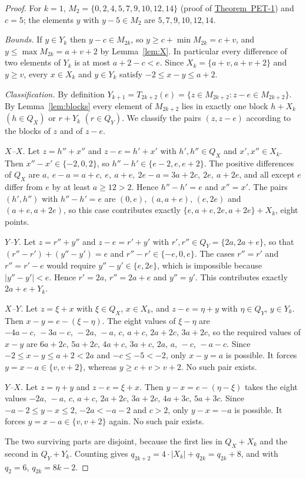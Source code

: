 \documentclass[11pt]{amsart}
\theoremstyle{definition}
\theoremstyle{remark}
\theoremstyle{plain}
\numberwithin{equation}{section}
\newcommand{\PETone}{\hyperref[thm:pet1]{Theorem~PET-1}}
\begin{document}
\begin{proof}
For $k=1$, $M_2=\{0,2,4,5,7,9,10,12,14\}$ (proof of \PETone) and $c=5$; the elements $y$ with
$y-5\in M_2$ are $5,7,9,10,12,14$.

\emph{Bounds.} If $y\in Y_k$ then $y-c\in M_{2k}$, so $y\ge c+\min M_{2k}=c+v$, and
$y\le\max M_{2k}=a+v+2$ by Lemma~\ref{lem:X}. In particular every difference of two elements of
$Y_k$ is at most $a+2-c<e$. Since $X_k=\{a+v,a+v+2\}$ and $y\ge v$, every $x\in X_k$ and
$y\in Y_k$ satisfy $-2\le x-y\le a+2$.

\emph{Classification.} By definition $Y_{k+1}=T_{2k+2}(e)=\{z\in M_{2k+2}:z-e\in M_{2k+2}\}$. By
Lemma~\ref{lem:blocks} every element of $M_{2k+2}$ lies in exactly one block $h+X_k$ $(h\in Q_X)$
or $r+Y_k$ $(r\in Q_Y)$. We classify the pairs $(z,z-e)$ according to the blocks of $z$ and of
$z-e$.

\emph{$X$--$X$.} Let $z=h''+x''$ and $z-e=h'+x'$ with $h',h''\in Q_X$ and $x',x''\in X_k$. Then
$x''-x'\in\{-2,0,2\}$, so $h''-h'\in\{e-2,e,e+2\}$. The positive differences of $Q_X$ are
$a,\ e-a=a+c,\ e,\ a+e,\ 2e-a=3a+2c,\ 2e,\ a+2e$, and all except $e$ differ from $e$ by at least
$a\ge12>2$. Hence $h''-h'=e$ and $x''=x'$. The pairs $(h',h'')$ with $h''-h'=e$ are $(0,e)$,
$(a,a+e)$, $(e,2e)$ and $(a+e,a+2e)$, so this case contributes exactly
$\{e,a+e,2e,a+2e\}+X_k$, eight points.

\emph{$Y$--$Y$.} Let $z=r''+y''$ and $z-e=r'+y'$ with $r',r''\in Q_Y=\{2a,2a+e\}$, so that
$(r''-r')+(y''-y')=e$ and $r''-r'\in\{-e,0,e\}$. The cases $r''=r'$ and $r''=r'-e$ would require
$y''-y'\in\{e,2e\}$, which is impossible because $|y''-y'|<e$. Hence $r'=2a$, $r''=2a+e$ and
$y''=y'$. This contributes exactly $2a+e+Y_k$.

\emph{$X$--$Y$.} Let $z=\xi+x$ with $\xi\in Q_X$, $x\in X_k$, and $z-e=\eta+y$ with $\eta\in Q_Y$,
$y\in Y_k$. Then $x-y=e-(\xi-\eta)$. The eight values of $\xi-\eta$ are
$-4a-c,\,-3a-c,\,-2a,\,-a,\,c,\,a+c,\,2a+2c,\,3a+2c$, so the required values of $x-y$ are
$6a+2c,\,5a+2c,\,4a+c,\,3a+c,\,2a,\,a,\,-c,\,-a-c$. Since $-2\le x-y\le a+2<2a$ and
$-c\le-5<-2$, only $x-y=a$ is possible. It forces $y=x-a\in\{v,v+2\}$, whereas $y\ge c+v>v+2$.
No such pair exists.

\emph{$Y$--$X$.} Let $z=\eta+y$ and $z-e=\xi+x$. Then $y-x=e-(\eta-\xi)$ takes the eight values
$-2a,\,-a,\,c,\,a+c,\,2a+2c,\,3a+2c,\,4a+3c,\,5a+3c$. Since $-a-2\le y-x\le2$, $-2a<-a-2$ and
$c>2$, only $y-x=-a$ is possible. It forces $y=x-a\in\{v,v+2\}$ again. No such pair exists.

The two surviving parts are disjoint, because the first lies in $Q_X+X_k$ and the second in
$Q_Y+Y_k$. Counting gives $q_{2k+2}=4\cdot|X_k|+q_{2k}=q_{2k}+8$, and with $q_2=6$, $q_{2k}=8k-2$.
\end{proof}
\end{document}
